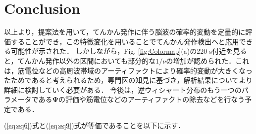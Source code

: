 \documentclass[journal]{IEEEtran}
\begin{document}
\section{Conclusion}
以上より，提案法を用いて，てんかん発作に伴う脳波の確率的変動を定量的に評価することができ，この特徴変化を用いることでてんかん発作検出へと応用できる可能性が示された．
しかしながら，Fig. \ref{fig:Colormap}(a)の220 s付近を見ると，てんかん発作以外の区間においても部分的な$1/\nu$の増加が認められた．これは，筋電位などの高周波帯域のアーティファクトにより確率的変動が大きくなったためであると考えられるため，専門医の知見に基づき，解析結果についてより詳細に検討していく必要がある．
今後は，逆ウィシャート分布のもう一つのパラメータである$\mathbf{\Psi}$の評価や筋電位などのアーティファクトの除去などを行なう予定である．


(\ref{eq:eq6})式と(\ref{eq:eq9})式が等価であることを以下に示す．
\end{document}
